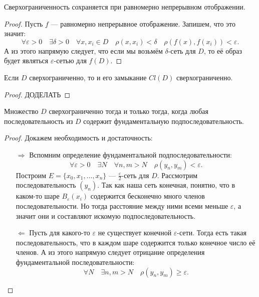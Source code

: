\begin{lemma}
	Сверхограниченность сохраняется при равномерно непрерывном отображении.
\end{lemma}

\begin{proof}
	Пусть \(f\) --- равномерно непрерывное отображение. Запишем, что это значит: \[
	\forall \varepsilon > 0 \quad \exists \delta > 0 \quad \forall x, x_i \in D \quad \rho(x, x_i) < \delta \quad \rho(f(x), f(x_i)) < \varepsilon.
	\]
	А из этого напрямую следует, что если мы возьмём \(\delta\)-сеть для \(D\), то её образ будет являться \(\varepsilon\)-сетью для \(f(D)\).
\end{proof}

\begin{lemma}
	Если \(D\) сверхограниченно, то и его замыкание \(Cl(D)\) сверхограниченно.
\end{lemma}

\begin{proof}
	ДОДЕЛАТЬ
\end{proof}

\begin{lemma}
	Множество \(D\) сверхограниченно тогда и только тогда, когда любая последовательность из \(D\) содержит фундаментальную подпоследовательность.
\end{lemma}

\begin{proof}
	Докажем необходимость и достаточность:
	\begin{enumerate}
		\item[\(\Rightarrow\)] Вспомним определение фундаментальной подпоследовательности: \[
		\forall \varepsilon > 0 \quad \exists N \quad \forall n, m > N \quad \rho(y_{n}, y_{m}) < \varepsilon.
		\]
		Построим \(E = \{x_0, x_1,\ldots, x_n\}\) ---  \(\frac{\varepsilon}{2}\)-сеть для \(D\). Рассмотрим последовательность \((y_n)\). Так как наша сеть конечная, понятно, что в каком-то шаре \(B_\varepsilon (x_i)\) содержится бесконечно много членов последовательности. Но тогда расстояние между ними всеми меньше \(\varepsilon\), а значит они и составляют искомую подпоследовательность.
		\item[\(\Leftarrow\)] Пусть для какого-то \(\varepsilon\) не существует конечной \(\varepsilon\)-сети. Тогда есть такая последовательность, что в каждом шаре содержится только конечное число её членов. А из этого напрямую следует отрицание определения фундаментальной последовательности: \[
		\forall N \quad \exists n, m > N \quad \rho(y_{n}, y_{m}) \geqslant \varepsilon.
		\]
	\end{enumerate}
\end{proof}

